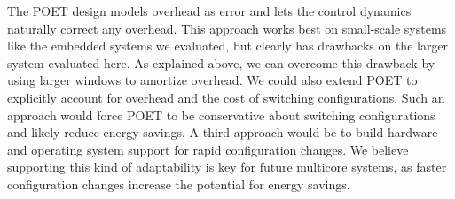 The POET design models overhead as error and lets the control dynamics naturally correct any overhead.
This approach works best on small-scale systems like the embedded systems we evaluated, but clearly has drawbacks on the larger system evaluated here.
As explained above, we can overcome this drawback by using larger windows to amortize overhead.
We could also extend POET to explicitly account for overhead and the cost of switching configurations.
Such an approach would force POET to be conservative about switching configurations and likely reduce energy savings.
A third approach would be to build hardware and operating system support for rapid configuration changes.
We believe supporting this kind of adaptability is key for future multicore systems, as faster configuration changes increase the potential for energy savings.
